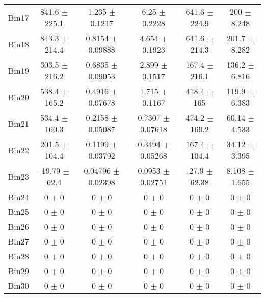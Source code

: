\begin{tabular}{@{\extracolsep{4pt}}lccccc@{}}
     Bin17 & 841.6 $\pm$ 225.1 & 1.235 $\pm$ 0.1217 & 6.25 $\pm$ 0.2228 & 641.6 $\pm$ 224.9 & 200 $\pm$ 8.248 \\ 
     Bin18 & 843.3 $\pm$ 214.4 & 0.8154 $\pm$ 0.09888 & 4.654 $\pm$ 0.1923 & 641.6 $\pm$ 214.3 & 201.7 $\pm$ 8.282 \\ 
     Bin19 & 303.5 $\pm$ 216.2 & 0.6835 $\pm$ 0.09053 & 2.899 $\pm$ 0.1517 & 167.4 $\pm$ 216.1 & 136.2 $\pm$ 6.816 \\ 
     Bin20 & 538.4 $\pm$ 165.2 & 0.4916 $\pm$ 0.07678 & 1.715 $\pm$ 0.1167 & 418.4 $\pm$ 165 & 119.9 $\pm$ 6.383 \\ 
     Bin21 & 534.4 $\pm$ 160.3 & 0.2158 $\pm$ 0.05087 & 0.7307 $\pm$ 0.07618 & 474.2 $\pm$ 160.2 & 60.14 $\pm$ 4.533 \\ 
     Bin22 & 201.5 $\pm$ 104.4 & 0.1199 $\pm$ 0.03792 & 0.3494 $\pm$ 0.05268 & 167.4 $\pm$ 104.4 & 34.12 $\pm$ 3.395 \\ 
     Bin23 & -19.79 $\pm$ 62.4 & 0.04796 $\pm$ 0.02398 & 0.0953 $\pm$ 0.02751 & -27.9 $\pm$ 62.38 & 8.108 $\pm$ 1.655 \\ 
     Bin24 & 0 $\pm$ 0 & 0 $\pm$ 0 & 0 $\pm$ 0 & 0 $\pm$ 0 & 0 $\pm$ 0 \\ 
     Bin25 & 0 $\pm$ 0 & 0 $\pm$ 0 & 0 $\pm$ 0 & 0 $\pm$ 0 & 0 $\pm$ 0 \\ 
     Bin26 & 0 $\pm$ 0 & 0 $\pm$ 0 & 0 $\pm$ 0 & 0 $\pm$ 0 & 0 $\pm$ 0 \\ 
     Bin27 & 0 $\pm$ 0 & 0 $\pm$ 0 & 0 $\pm$ 0 & 0 $\pm$ 0 & 0 $\pm$ 0 \\ 
     Bin28 & 0 $\pm$ 0 & 0 $\pm$ 0 & 0 $\pm$ 0 & 0 $\pm$ 0 & 0 $\pm$ 0 \\ 
     Bin29 & 0 $\pm$ 0 & 0 $\pm$ 0 & 0 $\pm$ 0 & 0 $\pm$ 0 & 0 $\pm$ 0 \\ 
     Bin30 & 0 $\pm$ 0 & 0 $\pm$ 0 & 0 $\pm$ 0 & 0 $\pm$ 0 & 0 $\pm$ 0 \\ 
\hline\hline
  \end{tabular}
